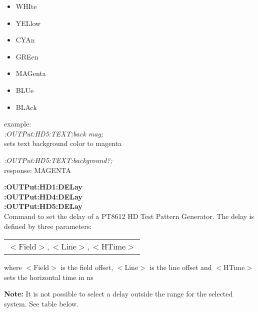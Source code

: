\begin{itemize}
\item WHIte \\
\item YELlow\\
\item CYAn\\
\item GREen\\
\item MAGenta\\
\item BLUe\\
\item BLAck\\
\end{itemize}

example:\\
\textit{:OUTPut:HD5:TEXT:back mag;}\\
sets text background color to magenta

\textit{:OUTPut:HD5:TEXT:background?;}\\
response: MAGENTA

\textbf{:OUTPut:HD1:DELay}\\
\textbf{:OUTPut:HD4:DELay}\\
\textbf{:OUTPut:HD5:DELay}\\
Command to set the delay of a PT8612 HD Test Pattern Generator. The delay is defined by three parameters:

\begin{tabular}{l}
    $<$Field$>,<$Line$>,<$HTime$>$ \\
\end{tabular}

where $<$Field$>$ is the field offset, $<$Line$>$ is the line offset and $<$HTime$>$ sets the horizontal time in ns

\textbf{Note:} It is not possible to select a delay outside the range for the selected system.  See table below.

